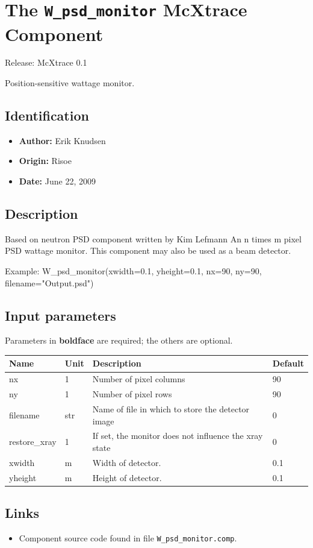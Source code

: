 \section{The \texttt{W\_psd\_monitor} McXtrace Component}
Release: McXtrace 0.1

Position-sensitive wattage monitor.

\subsection*{Identification}
\begin{itemize}
  \item \textbf{Author:} Erik Knudsen
  \item \textbf{Origin:} Risoe
  \item \textbf{Date:} June 22, 2009
\end{itemize}

\subsection*{Description}
Based on neutron PSD component written by Kim Lefmann An n times m pixel PSD wattage monitor. This component may also be used as a beam detector.

Example: W\_psd\_monitor(xwidth=0.1, yheight=0.1, nx=90, ny=90, filename="Output.psd")

\subsection*{Input parameters}
Parameters in \textbf{boldface} are required; the others are optional.

\begin{longtable}{p{}p{}p{}p{}}
\toprule
\textbf{Name} & \textbf{Unit} & \textbf{Description} & \textbf{Default} \\
\midrule
\endhead
nx & 1 & Number of pixel columns & 90 \\
ny & 1 & Number of pixel rows & 90 \\
filename & str & Name of file in which to store the detector image & 0 \\
restore\_xray & 1 & If set, the monitor does not influence the xray state & 0 \\
xwidth & m & Width of detector. & 0.1 \\
yheight & m & Height of detector. & 0.1 \\
\bottomrule
\end{longtable}

\subsection*{Links}
\begin{itemize}
  \item Component source code found in file \texttt{W\_psd\_monitor.comp}.
\end{itemize}
